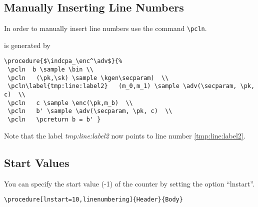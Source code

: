 \documentclass[a4paper]{report}
\begin{document}
\subsection{Manually Inserting Line Numbers}
In order to manually insert line numbers use the command \lstinline$\pcln$.
\begin{center}
\end{center}
is generated by 
\begin{lstlisting}
\procedure{$\indcpa_\enc^\adv$}{%
 \pcln  b \sample \bin \\
 \pcln   (\pk,\sk) \sample \kgen\secparam)  \\
 \pcln\label{tmp:line:label2}   (m_0,m_1) \sample \adv(\secparam, \pk, c)  \\
 \pcln   c \sample \enc(\pk,m_b)  \\
 \pcln   b' \sample \adv(\secparam, \pk, c)  \\
 \pcln   \pcreturn b = b' }
\end{lstlisting}
Note that the label \emph{tmp:line:label2} now points to line number \ref{tmp:line:label2}.



\subsection{Start Values}
You can specify the start value (-1) of the counter by setting the option \enquote{lnstart}.
\begin{lstlisting}
\procedure[lnstart=10,linenumbering]{Header}{Body}
\end{lstlisting}
\begin{center}
\end{center}
\end{document}
